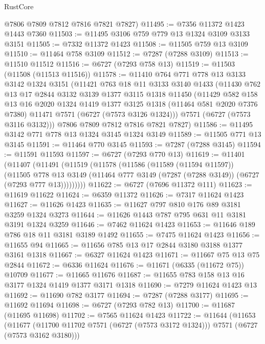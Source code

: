 \begin{lexlean}{RustCore}
\begin{coremodule}
      @7806
      @7809
      @7812
      @7816
      @7821
      @7827)
@11495 := @7356 @11372 @1423 @1443 @7360
@11503 := @11495 @3106 @759 @779 @13 @1324 @3109 @3133 @3151
@11505 := @7332 @11372 @1423
@11508 := @11505 @759 @13 @3109
@11510 := @11464 @758 @3109
@11512 := @7287 (@7288 @3109)
@11513 := @11510 @11512
@11516 := @6727 (@7293 @758 @13)
@11519 := @11503 (@11508 (@11513 @11516))
@11578 := @11410
    @764
    @771
    @778
    @13
    @3133
    @3142
    @1324
    @3151
    (@11421
      @763
      @18
      @11
      @3133
      @3140
      @1433
      (@11430
        @762
        @13
        @17
        @2844
        @3132
        @3139
        @1377
        @3115
        @1318
        @11450
        (@11429
          @582
          @158
          @13
          @16
          @2020
          @1324
          @1419
          @1377
          @3125
          @1318
          (@11464 @581 @2020 @7376 @7380)
          @11471
          @7571
          (@6727 (@7573 @3126 @1324)))
        @7571
        (@6727 (@7573 @3116 @3132)))
      @7806
      @7809
      @7812
      @7816
      @7821
      @7827)
@11586 := @11495 @3142 @771 @778 @13 @1324 @3145 @1324 @3149
@11589 := @11505 @771 @13 @3145
@11591 := @11464 @770 @3145
@11593 := @7287 (@7288 @3145)
@11594 := @11591 @11593
@11597 := @6727 (@7293 @770 @13)
@11619 := @11401
    (@11407
      (@11491
        (@11519
          (@11578
            (@11586
              (@11589 (@11594 @11597))
              (@11505
                @778
                @13
                @3149
                (@11464 @777 @3149 (@7287 (@7288 @3149)) (@6727 (@7293 @777 @13)))))))))
@11622 := @6727 (@7696 @11372 @111)
@11623 := @11619 @11622
@11624 := @6359 @11372
@11626 := @7317 @11624 @1423
@11627 := @11626 @1423
@11635 := @11627 @797 @810 @176 @89 @3181 @3259 @1324 @3273
@11644 := @11626 @1443 @787 @795 @631 @11 @3181 @3191 @1324 @3259
@11646 := @7462 @11624 @1423
@11653 := @11646 @189 @786 @18 @11 @3181 @3189 @1492
@11655 := @7475 @11624 @1423
@11656 := @11655 @94
@11665 := @11656 @785 @13 @17 @2844 @3180 @3188 @1377 @3161 @1318
@11667 := @6327 @11624 @1423
@11671 := @11667 @75 @13 @75 @2844
@11672 := @6336 @11624
@11676 := @11671 (@6335 (@11672 @75)) @10709
@11677 := @11665 @11676
@11687 := @11655 @783 @158 @13 @16 @3177 @1324 @1419 @1377 @3171 @1318
@11690 := @7279 @11624 @1423 @13
@11692 := @11690 @782 @3177
@11694 := @7287 (@7288 @3177)
@11695 := @11692 @11694
@11698 := @6727 (@7293 @782 @13)
@11700 := @11687 (@11695 @11698)
@11702 := @7565 @11624 @1423
@11722 := @11644
    (@11653
      (@11677 (@11700 @11702 @7571 (@6727 (@7573 @3172 @1324))) @7571 (@6727 (@7573 @3162 @3180)))

\end{coremodule}
\end{lexlean}
